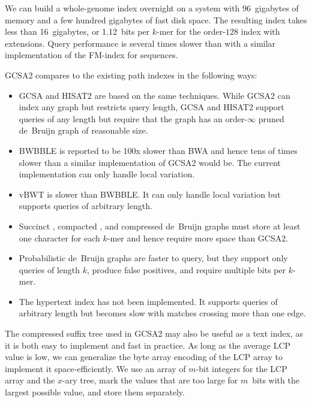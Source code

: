 \documentclass[a4paper,11pt]{llncs}
\newcommand{\kmer}[1]{$#1$\nobreakdash-mer}
\newcommand{\orderk}[1]{order\nobreakdash-$#1$}
\begin{document}
We can build a whole-genome index overnight on a system with 96~gigabytes of memory and a few hundred gigabytes of fast disk space. The resulting index takes less than 16~gigabytes, or 1.12~bits per \kmer{k} for the \orderk{128} index with extensions. Query performance is several times slower than with a similar implementation of the FM\nobreakdash-index for sequences.

GCSA2 compares to the existing path indexes in the following ways:
\begin{itemize}

\item GCSA \cite{Siren2014} and HISAT2 \cite{Kim2015-2016} are based on the same techniques. While GCSA2 can index any graph but restricts query length, GCSA and HISAT2 support queries of any length but require that the graph has an \orderk{\infty} pruned de~Bruijn graph of reasonable size.

\item BWBBLE \cite{Huang2013} is reported to be 100x slower than BWA \cite{Li2009} and hence tens of times slower than a similar implementation of GCSA2 would be. The current implementation can only handle local variation.

\item vBWT \cite{Maciuca2016} is slower than BWBBLE. It can only handle local variation but supports queries of arbitrary length.

\item Succinct \cite{Bowe2012}, compacted \cite{Cazaux2014}, and compressed \cite{Marcus2014} de~Bruijn graphs must store at least one character for each \kmer{k} and hence require more space than GCSA2.

\item Probabilistic de~Bruijn graphs \cite{Pell2012} are faster to query, but they support only queries of length $k$, produce false positives, and require multiple bits per \kmer{k}.

\item The hypertext index \cite{Thachuk2013} has not been implemented. It supports queries of arbitrary length but becomes slow with matches crossing more than one edge.

\end{itemize}

The compressed suffix tree used in GCSA2 may also be useful as a text index, as it is both easy to implement and fast in practice. As long as the average LCP value is low, we can generalize the byte array encoding of the LCP array \cite{Abouelhoda2004} to implement it space-efficiently. We use an array of $m$\nobreakdash-bit integers for the LCP array and the $x$\nobreakdash-ary tree, mark the values that are too large for $m$~bits with the largest possible value, and store them separately.
\end{document}
